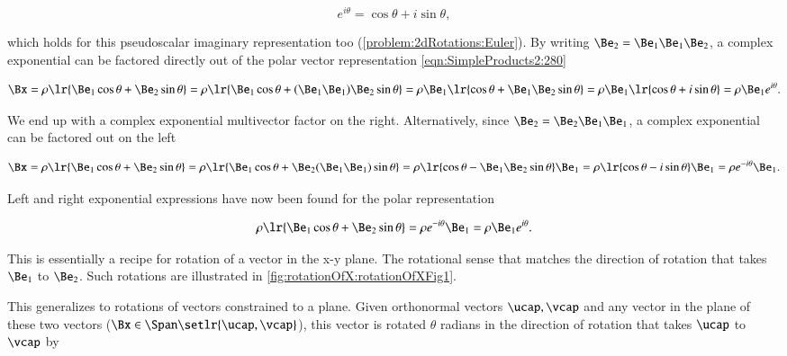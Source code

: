 \begin{dmath}\label{eqn:2dRotations:1140}
e^{i\theta} = \cos\theta + i \sin\theta,
\end{dmath}

which holds for this pseudoscalar imaginary representation too (\cref{problem:2dRotations:Euler}).
By writing \( \Be_2 = \Be_1 \Be_1 \Be_2 \),
a complex exponential can be factored directly out of the polar vector representation \cref{eqn:SimpleProducts2:280}

\begin{dmath}\label{eqn:SimpleProducts2:940}
\Bx
=
\rho \lr{ \Be_1 \cos\theta + \Be_2 \sin\theta }
=
\rho \lr{ \Be_1 \cos\theta + (\Be_1 \Be_1) \Be_2 \sin\theta }
=
\rho \Be_1 \lr{ \cos\theta + \Be_1 \Be_2 \sin\theta }
=
\rho \Be_1 \lr{ \cos\theta + i \sin\theta }
=
\rho \Be_1 e^{i\theta}.
\end{dmath}

We end up with a complex exponential multivector factor on the right.
Alternatively, since \( \Be_2 = \Be_2 \Be_1 \Be_1 \), a complex exponential can be factored out on the left

\begin{dmath}\label{eqn:SimpleProducts2:960}
\Bx
=
\rho \lr{ \Be_1 \cos\theta + \Be_2 \sin\theta }
=
\rho \lr{ \Be_1 \cos\theta + \Be_2 (\Be_1 \Be_1) \sin\theta }
=
\rho \lr{ \cos\theta - \Be_1 \Be_2 \sin\theta } \Be_1
=
\rho \lr{ \cos\theta - i \sin\theta } \Be_1
=
\rho e^{-i\theta} \Be_1.
\end{dmath}

Left and right exponential expressions have now been found for the polar representation

\begin{equation}\label{eqn:SimpleProducts2:1120}
\rho \lr{ \Be_1 \cos\theta + \Be_2 \sin\theta }
= \rho e^{-i\theta} \Be_1 = \rho \Be_1 e^{i\theta}.
\end{equation}

This is essentially a recipe for rotation of a vector in the x-y plane.
The rotational sense that matches the direction of rotation that takes
\( \Be_1 \) to \( \Be_2 \).
Such rotations are
illustrated in \cref{fig:rotationOfX:rotationOfXFig1}.

This generalizes to rotations of  vectors constrained to a plane.
Given orthonormal vectors \( \ucap, \vcap \) and any vector in the plane of these two vectors (\( \Bx \in \Span\setlr{\ucap,\vcap} \)), this vector is rotated \( \theta \) radians in the direction of rotation that takes \( \ucap \) to \( \vcap \) by

